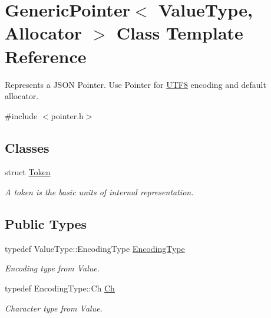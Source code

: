\hypertarget{class_generic_pointer}{}\section{Generic\+Pointer$<$ Value\+Type, Allocator $>$ Class Template Reference}
\label{class_generic_pointer}


Represents a J\+S\+ON Pointer. Use Pointer for \hyperlink{struct_u_t_f8}{U\+T\+F8} encoding and default allocator.  




{\ttfamily \#include $<$pointer.\+h$>$}

\subsection*{Classes}
\begin{DoxyCompactItemize}
\item 
struct \hyperlink{struct_generic_pointer_1_1_token}{Token}
\begin{DoxyCompactList}\small\item\em A token is the basic units of internal representation. \end{DoxyCompactList}\end{DoxyCompactItemize}
\subsection*{Public Types}
\begin{DoxyCompactItemize}
\item 
typedef Value\+Type\+::\+Encoding\+Type \hyperlink{class_generic_pointer_a4b802da797a7a0b615fd9611cedb7c3b}{Encoding\+Type}\hypertarget{class_generic_pointer_a4b802da797a7a0b615fd9611cedb7c3b}{}\label{class_generic_pointer_a4b802da797a7a0b615fd9611cedb7c3b}

\begin{DoxyCompactList}\small\item\em Encoding type from Value. \end{DoxyCompactList}\item 
typedef Encoding\+Type\+::\+Ch \hyperlink{class_generic_pointer_a38b73c84d37428340066d907f9d4f37f}{Ch}\hypertarget{class_generic_pointer_a38b73c84d37428340066d907f9d4f37f}{}\label{class_generic_pointer_a38b73c84d37428340066d907f9d4f37f}

\begin{DoxyCompactList}\small\item\em Character type from Value. \end{DoxyCompactList}\end{DoxyCompactItemize}
